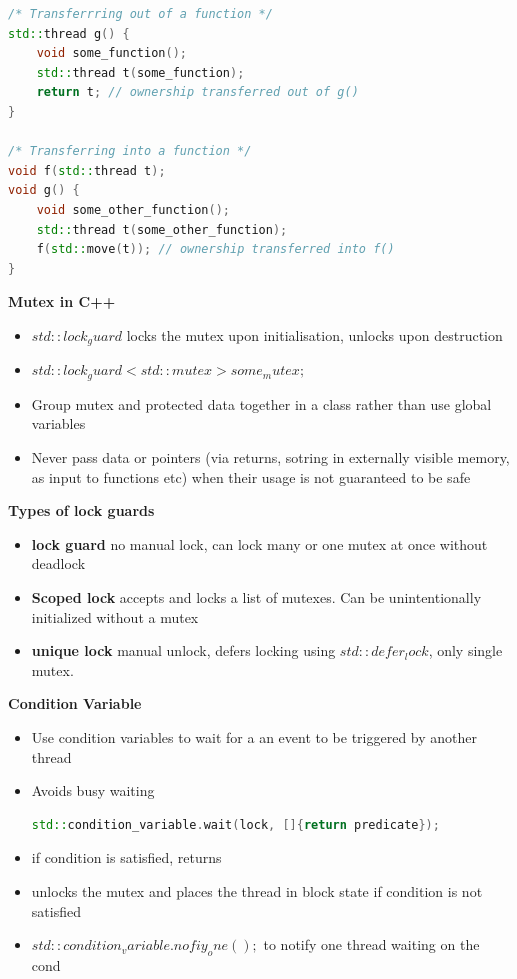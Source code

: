 \documentclass[10pt, landscape]{article}
\begin{document}
\begin{multicols}{4}
\begin{itemize}
\begin{itemize}
\begin{lstlisting}[language=C++, breaklines=true, breakatwhitespace=true]
/* Transferrring out of a function */
std::thread g() {
    void some_function();
    std::thread t(some_function);
    return t; // ownership transferred out of g()
}

/* Transferring into a function */
void f(std::thread t);
void g() {
    void some_other_function();
    std::thread t(some_other_function);
    f(std::move(t)); // ownership transferred into f()
}
    \end{lstlisting}
\end{itemize}


\textbf{Mutex in C++} \\
\begin{itemize}
    \item $std::lock_guard$ locks the mutex upon initialisation, unlocks upon destruction
    \item $std::lock_guard<std::mutex>{some_mutex};$ 
    \item Group mutex and protected data together in a class rather than use global variables
    \item Never pass data or pointers (via returns, sotring in externally visible memory, as input to functions etc) when their usage is not guaranteed to be safe
\end{itemize}


\textbf{Types of lock guards}
\begin{itemize}
    \item \textbf{lock guard} no manual lock, can lock many or one mutex at once without deadlock
    \item \textbf{Scoped lock} accepts and locks a list of mutexes. Can be unintentionally initialized without a mutex
    \item \textbf{unique lock} manual unlock, defers locking using $std::defer_lock$, only single mutex. 
\end{itemize}

\textbf{Condition Variable} \\
\begin{itemize}
    \item Use condition variables to wait for a an event to be triggered by another thread
    \item Avoids busy waiting 
    \begin{lstlisting}[language=C++, breaklines=true, breakatwhitespace=true]
std::condition_variable.wait(lock, []{return predicate});
    \end{lstlisting}
    \item if condition is satisfied, returns
    \item unlocks the mutex and places the thread in block state if condition is not satisfied
    \item $std::condition_variable.nofiy_one();$ to notify one thread waiting on the cond
\end{itemize}



\end{itemize}
\end{multicols}
\end{document}
